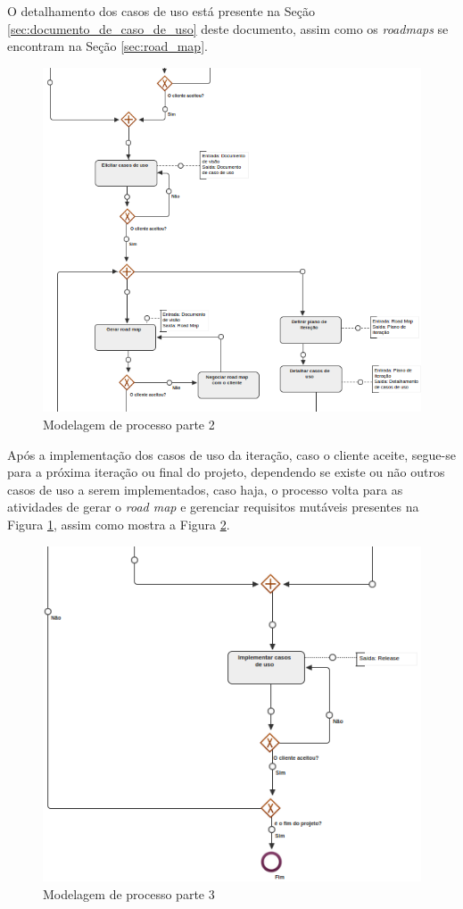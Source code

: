 O detalhamento dos casos de uso está presente na Seção \ref{sec:documento_de_caso_de_uso} deste documento, assim como os \textit{roadmaps} se encontram na Seção \ref{sec:road_map}.

\begin{figure}[H]
	\centering
	\includegraphics[width=1\textwidth]{imgModelagem/modelagem2}
	\caption{Modelagem de processo parte 2}
	\label{img:modelagem2}
\end{figure}

Após a implementação dos casos de uso da iteração, caso o cliente aceite, segue-se para a próxima iteração ou final do projeto, dependendo se existe ou não outros casos de uso a serem implementados, caso haja, o processo volta para as atividades de gerar o \textit{road map}  e gerenciar requisitos mutáveis presentes na Figura \ref{img:modelagem2}, assim como mostra a Figura \ref{img:modelagem3}.

\begin{figure}[H]
	\centering
	\includegraphics[width=1\textwidth]{imgModelagem/modelagem3}
	\caption{Modelagem de processo parte 3}
	\label{img:modelagem3}
\end{figure}

